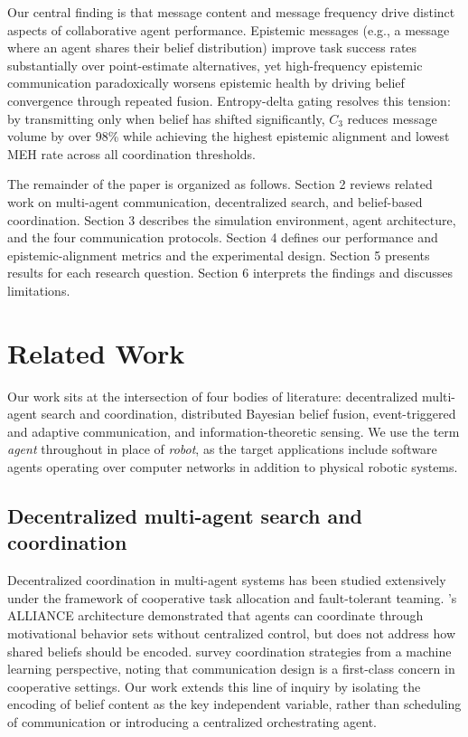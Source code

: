 \documentclass[pdflatex,sn-mathphys-num]{sn-jnl}%
\theoremstyle{thmstyleone}%
\theoremstyle{thmstyletwo}%
\theoremstyle{thmstylethree}%
\begin{document}
Our central finding is that message content and message frequency drive distinct aspects of collaborative agent performance. Epistemic messages (e.g., a message where an agent shares their belief distribution) improve task success rates substantially over point-estimate alternatives, yet high-frequency epistemic communication paradoxically worsens epistemic health by driving belief convergence through repeated fusion. Entropy-delta gating resolves this tension: by transmitting only when belief has shifted significantly, 
$C_3$ reduces message volume by over 98\% while achieving the highest epistemic alignment and lowest MEH rate across all coordination thresholds.

The remainder of the paper is organized as follows. Section 2 reviews related work on multi-agent communication, decentralized search, and belief-based coordination. Section 3 describes the simulation environment, agent architecture, and the four communication protocols. Section 4 defines our performance and epistemic-alignment metrics and the experimental design. Section 5 presents results for each research question. Section 6 interprets the findings and discusses limitations.

\section{Related Work}
\label{sec:related}
Our work sits at the intersection of four bodies of literature: decentralized multi-agent search and coordination, distributed Bayesian belief fusion, event-triggered and adaptive communication, 
and information-theoretic sensing. We use the term \textit{agent} throughout in place of \textit{robot}, as the target applications include software agents operating over computer networks in addition to physical robotic systems.

\subsection{Decentralized multi-agent search and coordination}

Decentralized coordination in multi-agent systems has been studied extensively under the framework of cooperative task allocation and fault-tolerant teaming. \cite{parker2002alliance}'s ALLIANCE architecture demonstrated that agents can coordinate through motivational behavior sets without centralized control, but does not address how shared beliefs should be encoded. \citet{stone2000multiagent} survey coordination strategies from a machine learning perspective, noting that communication design is a first-class concern in cooperative settings. Our work extends this line of inquiry by isolating the encoding of belief content as the key independent variable, rather than scheduling of communication or introducing a centralized orchestrating agent.
\end{document}

